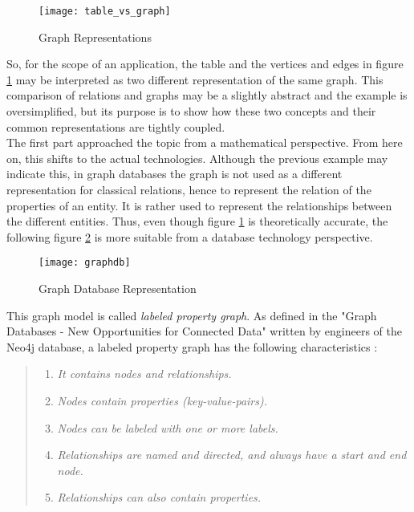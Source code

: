 \begin{figure}[H]
	\centering
	\texttt{[image: table\_vs\_graph]}
	\caption[Graph Representations]{Graph Representations }
	\label{fig:GraphTheoryExample}
\end{figure}

So, for the scope of an application, the table and the vertices and edges in figure \ref{fig:GraphTheoryExample} may be interpreted as two different representation of the same graph. This comparison of relations and graphs may be a slightly abstract and the example is oversimplified, but its purpose is to show how these two concepts and their common representations are tightly coupled.\\

The first part approached the topic from a mathematical perspective. From here on, this shifts to the actual technologies. Although the previous example may indicate this, in graph databases the graph is not used as a different representation for classical relations, hence to represent the relation of the properties of an entity. It is rather used to represent the relationships between the different entities. Thus, even though figure \ref{fig:GraphTheoryExample} is theoretically accurate, the following figure \ref{fig:GraphDBExample} is more suitable from a database technology perspective.

\begin{figure}[H]
	\centering
	\texttt{[image: graphdb]}
	\caption[Graph Database Representation]{Graph Database Representation }
	\label{fig:GraphDBExample}
\end{figure}

This graph model is called \emph{labeled property graph}. As defined in the "Graph Databases - New Opportunities for Connected Data" written by engineers of the Neo4j database, a labeled property graph has the following characteristics \cite{neo4j}:

\begin{quote}
	\begin{enumerate}
		\item\textit{It contains nodes and relationships. }
		\item\textit{Nodes contain properties (key-value-pairs). }
		\item\textit{Nodes can be labeled with one or more labels. }
		\item\textit{Relationships are named and directed, and always have a start and end node. }
		\item\textit{Relationships can also contain properties. }
	\end{enumerate}
\end{quote}

